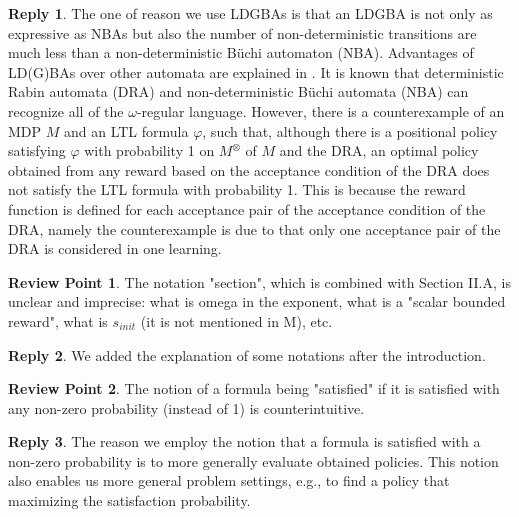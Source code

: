 \documentclass[10 pt, dvipdfmx]{article}
\theoremstyle{definition}
\newtheorem{review point}{Review Point}[section]
\newtheorem*{reply}{Reply}
\begin{document}
\begin{reply}
The one of reason we use LDGBAs is that an LDGBA is not only as expressive as NBAs but also the number of non-deterministic transitions are much less than a non-deterministic B\"{u}chi automaton (NBA).
Advantages of LD(G)BAs over other automata are explained in \cite{Hahn2019}. It is known that deterministic Rabin automata (DRA) and non-deterministic B\"{u}chi automata (NBA) can recognize all of the $\omega$-regular language. However, there is a counterexample of an MDP $M$ and an LTL formula $\varphi$, such that, although there is a positional policy satisfying $\varphi$ with probability 1 on $M^{\otimes}$ of $M$ and the DRA, an optimal policy obtained from any reward based on the acceptance condition of the DRA does not satisfy the LTL formula with probability 1. This is because the reward function is defined for each acceptance pair of the acceptance condition of the DRA, namely the counterexample is due to that only one acceptance pair of the DRA is considered in one learning.
\end{reply}

\begin{review point}
  The notation "section", which is combined with Section II.A, is
unclear and imprecise: what is omega in the exponent, what is a "scalar
bounded reward", what is $s_{init}$ (it is not mentioned in M), etc.
\end{review point}

\begin{reply}
  We added the explanation of some notations after the introduction.
\end{reply}

\begin{review point}
  The notion of a formula being "satisfied" if it is satisfied with any
non-zero probability (instead of 1) is counterintuitive.
\end{review point}

\begin{reply}
  The reason we employ the notion that a formula is satisfied with a non-zero probability is to more generally evaluate obtained policies. This notion also enables us more general problem settings, e.g., to find a policy that maximizing the satisfaction probability.
\end{reply}
\end{document}
